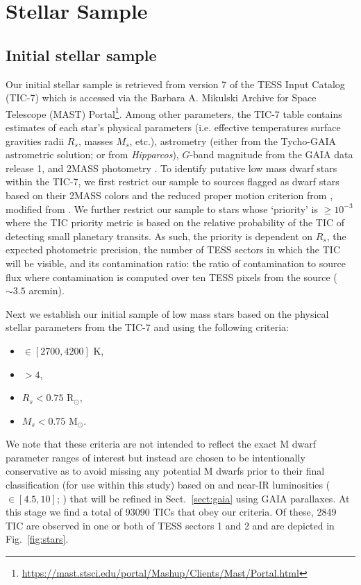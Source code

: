 \section{Stellar Sample} \label{sect:stars}
\subsection{Initial stellar sample}
Our initial stellar sample is retrieved from version 7 of the TESS Input Catalog (TIC-7) which
is accessed via the Barbara A. Mikulski Archive for Space Telescope (MAST)
Portal\footnote{\url{https://mast.stsci.edu/portal/Mashup/Clients/Mast/Portal.html}}. Among other
parameters, the TIC-7 table contains estimates of each star's physical parameters (i.e. effective
temperatures \teff{,} surface gravities \logg{,} radii $R_s$, masses $M_s$, etc.),
astrometry (either from the Tycho-GAIA astrometric solution; \citealt{gaia16,brown16}
or from \emph{Hipparcos}), $G$-band magnitude from the GAIA data release 1, and 2MASS photometry
\citep{cutri03}. To identify putative low mass dwarf stars within the TIC-7, we first restrict our sample to
sources flagged as dwarf stars based on their 2MASS colors and the reduced proper motion criterion
from \cite{stassun17}, modified from \cite{collier07}. We further restrict our sample to stars whose
`priority' is $\geq 10^{-3}$ where the TIC priority metric is based on the relative probability of the TIC
of detecting small planetary transits. As such, the priority is dependent on $R_s$, the
expected photometric precision, the number of TESS sectors in which the TIC will be visible, and its
contamination ratio: the ratio of contamination to source flux where contamination is computed over ten
TESS pixels from the source ($\sim 3.5$ arcmin).

Next we establish our initial sample of low mass stars based on the physical stellar parameters from the
TIC-7 and using the following criteria:

\begin{itemize}
\item \teff{} $\in [2700,4200]$ K,
\item \logg{} $>4$,
\item $R_s < 0.75$ R$_{\odot}$,
\item $M_s < 0.75$ M$_{\odot}$.
\end{itemize}

\noindent We note that these criteria are not intended to reflect the exact M dwarf parameter ranges of
interest but instead are chosen to be intentionally conservative as to avoid missing any potential
M dwarfs prior to their final classification (for use within this study) based on \teff{} and 
near-IR luminosities  (\MK{} $\in [4.5,10]$; \citealt{delfosse00, benedict16}) that will be refined
in Sect.~\ref{sect:gaia} using GAIA parallaxes.
At this stage we find a total of 93090 TICs that obey our criteria. Of these, 2849 TIC are observed in
one or both of TESS sectors 1 and 2 and are depicted in Fig.~\ref{fig:stars}.

